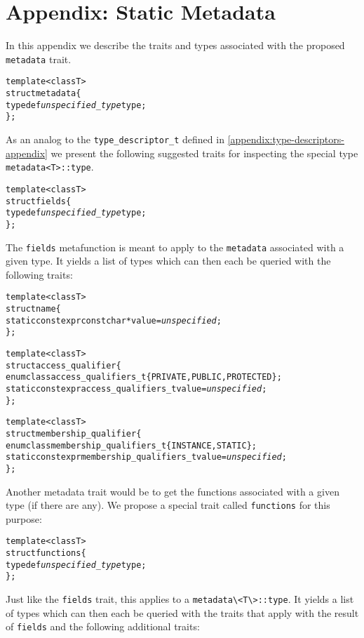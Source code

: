 \section{Appendix: Static Metadata}
\label{appendix:metadata-appendix}

In this appendix we describe the traits and types associated with the proposed
\verb+metadata+ trait.

\begin{alltt}
  template <class T>
  struct metadata \{
    typedef \emph{unspecified\_type} type;
  \};
\end{alltt}

As an analog to the \verb+type_descriptor_t+ defined in
\autoref{appendix:type-descriptors-appendix} we present the following
suggested traits for inspecting the special type \verb+metadata<T>::type+.

\begin{alltt}
  template <class T>
  struct fields \{
    typedef \emph{unspecified\_type} type;
  \};
\end{alltt}

The \verb+fields+ metafunction is meant to apply to the \verb+metadata+
associated with a given type. It yields a list of types which can then each be
queried with the following traits:

\begin{alltt}
  template <class T>
  struct name \{
    static constexpr const char* value = \emph{unspecified};
  \};
  
  template <class T>
  struct access\_qualifier \{
    enum class access\_qualifiers\_t \{ PRIVATE, PUBLIC, PROTECTED \};
    static constexpr access_qualifiers\_t value = \emph{unspecified};
  \};
  
  template <class T>
  struct membership\_qualifier \{
    enum class membership\_qualifiers\_t \{ INSTANCE, STATIC \};
    static constexpr membership\_qualifiers\_t value = \emph{unspecified};
  \};
\end{alltt}

Another metadata trait would be to get the functions associated with a given
type (if there are any). We propose a special trait called \verb+functions+
for this purpose:

\begin{alltt}
  template <class T>
  struct functions \{
    typedef \emph{unspecified\_type} type;
  \};
\end{alltt}

Just like the \verb+fields+ trait, this applies to a
\verb+metadata\<T\>::type+. It yields a list of types which can then each be
queried with the traits that apply with the result of \verb+fields+ and the
following additional traits:

